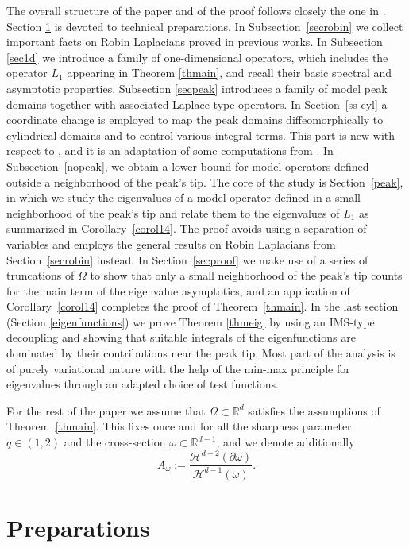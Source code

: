 \documentclass[11pt,oneside,reqno,a4paper]{amsart}
\newcommand{\R}{\mathbb{R}}
\renewcommand{\H}{\mathcal{H}}
\theoremstyle{definition}
\begin{document}
The overall structure of the paper and of the proof follows closely the one in \cite{kov}. Section \ref{secprel} is devoted to technical preparations. In Subsection~\ref{secrobin} we collect important facts on Robin Laplacians proved in previous works. In Subsection \ref{sec1d} we introduce a family of one-dimensional operators, which includes the operator $L_1$ appearing in Theorem \ref{thmain}, and recall their  basic spectral and asymptotic properties. Subsection \ref{secpeak} introduces
a family of model peak domains together with associated Laplace-type operators. In Section~\ref{ss-cyl}
a coordinate change is employed to map the peak domains diffeomorphically to cylindrical domains
and to control various integral terms. This part is new with respect to \cite{kov}, and it is an adaptation of some computations from \cite{vogel}. In Subsection~\ref{nopeak}, we obtain a lower bound for model operators defined outside a neighborhood
of the peak's tip. The core of the study is Section~\ref{peak}, in which we study the eigenvalues
of a model operator defined in a small neighborhood of the peak's tip and relate them to the eigenvalues of $L_1$ as summarized in Corollary~\ref{corol14}. The proof avoids using a separation of variables
and employs the general results on Robin Laplacians from Section~\ref{secrobin} instead.
In Section~\ref{secproof} we make use of a series of truncations of $\Omega$ to show that only a small neighborhood of the peak's tip counts for the main term of the eigenvalue asymptotics, and an application of Corollary~\ref{corol14} completes the proof of Theorem~\ref{thmain}. In the last section (Section \ref{eigenfunctions}) we prove Theorem \ref{thmeig}
by using an IMS-type decoupling and showing that suitable integrals of the eigenfunctions are dominated by their contributions
near the peak tip.  Most part of the analysis is of purely variational nature with the help
of the min-max principle for eigenvalues through an adapted choice of test functions.


For the rest of the paper we assume that $\Omega\subset\R^d$ satisfies the assumptions of Theorem~\ref{thmain}. This fixes once and for all the sharpness parameter $q\in(1,2)$ and the cross-section $\omega\subset\R^{d-1}$, and we denote additionally
\[
A_\omega:=\dfrac{\H^{d-2}(\partial\omega)}{\H^{d-1}(\omega)}.
\]

	\section{Preparations}\label{secprel}
\end{document}
